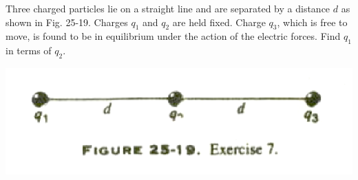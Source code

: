 \documentclass[11pt,letterpaper,boxed]{hmcpset}
\begin{document}
	\begin{solution}
		\vfill
	\end{solution}
	\newpage
	
	
	\begin{problem}[HRK E25.7*]
		Three charged particles lie on a straight line and are separated by a distance $d$ as shown in Fig. 25-19. Charges $q_1$ and $q_2$ are held fixed. Charge $q_3$, which is free to move, is found to be in equilibrium under the action of the electric forces. Find $q_1$ in terms of $q_2$.
		
		\begin{center}
			\includegraphics[scale=0.5]{25-19.png}
		\end{center}
		
	\end{problem}
	
	\begin{solution}
		\vfill
	\end{solution}
	\newpage
	
\end{document}
